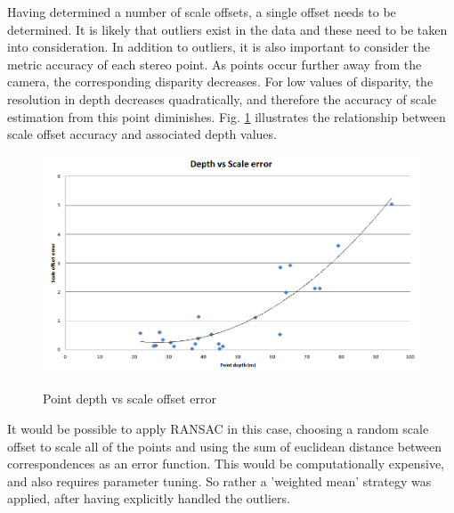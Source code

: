 Having determined a number of scale offsets, a single offset needs to be determined.  It is likely that outliers exist in the data and these need to be taken into consideration.  In addition to outliers, it is also important to consider the metric accuracy of each stereo point.  As points occur further away from the camera, the corresponding disparity decreases.  For low values of disparity, the resolution in depth decreases quadratically, and therefore the accuracy of scale estimation from this point diminishes. Fig. \ref{fig:scale_bar_graph} illustrates the relationship between scale offset accuracy and associated depth values.
\begin{figure}[h]
  \centering
    \includegraphics[width=1.0\textwidth]{chapters/images/distance_vs_scale_error}\\
  \caption{Point depth vs scale offset error}
  \label{fig:scale_bar_graph}
\end{figure}


It would be possible to apply RANSAC in this case, choosing a random scale offset to scale all of the points and using the sum of euclidean distance between correspondences as an error function.  This would be computationally expensive, and also requires parameter tuning.  So rather a 'weighted mean' strategy was applied, after having explicitly handled the outliers.

